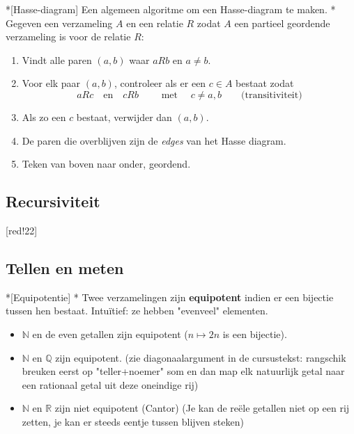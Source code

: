 \begin{nicealgorithm}*[Hasse-diagram]\label{alg:l3_hasse}
    Een algemeen algoritme om een Hasse-diagram te maken.
    \nextpart[Algoritme.]*
    Gegeven een verzameling $A$ en een relatie $R$ zodat $A$ een partieel geordende verzameling is voor de relatie $R$:
    \begin{enumerate}
        \item Vindt alle paren $(a,b)$ waar $aRb$ en $a \neq b$.
        \item Voor elk paar $(a,b)$, controleer als er een $c \in A$ bestaat zodat
        \begin{equation*}
            aRc \quad \text{en} \quad cRb \qquad \text{ met } \quad c \neq a,b \qquad \text{(transitiviteit)}
        \end{equation*}
        \item Als zo een $c$ bestaat, verwijder dan $(a,b)$.
        \item De paren die overblijven zijn de \emph{edges} van het Hasse diagram.
        \item Teken van boven naar onder, geordend.
    \end{enumerate}
\end{nicealgorithm}

\subsection{Recursiviteit}

 [red!22]  

\subsection{Tellen en meten}

\begin{nicedefinition}*[Equipotentie]
    \nextpart[]*
    Twee verzamelingen zijn \textcolor{PineGreen!75!black}{\textbf{equipotent}} indien er een bijectie tussen hen bestaat. Intuïtief: ze hebben "evenveel" elementen.
\end{nicedefinition}

\textbf{}
\begin{itemize}
    \item $\mathbb{N}$ en de even getallen zijn equipotent ($n \mapsto 2n$ is een bijectie).
    \item $\mathbb{N} \text{ en } \mathbb{Q}$ zijn equipotent. (zie diagonaalargument in de cursustekst: rangschik breuken eerst op "teller+noemer" som en dan map elk natuurlijk getal naar een rationaal getal uit deze oneindige rij)
    \item $\mathbb{N}$ en $\mathbb{R}$ zijn niet equipotent (Cantor) (Je kan de reële getallen niet op een rij zetten, je kan er steeds eentje tussen blijven steken)
\end{itemize}

